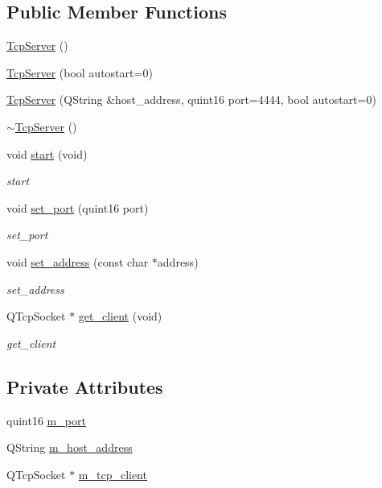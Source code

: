 \subsection*{Public Member Functions}
\begin{DoxyCompactItemize}
\item 
\mbox{\hyperlink{class_tcp_server_abc977059ef61f1c42f5fda1bc5945ab0}{Tcp\+Server}} ()
\item 
\mbox{\hyperlink{class_tcp_server_af43d51237b45ebb729911d829dfa7856}{Tcp\+Server}} (bool autostart=0)
\item 
\mbox{\hyperlink{class_tcp_server_a5242d1465353dd6e57bf556416021598}{Tcp\+Server}} (Q\+String \&host\+\_\+address, quint16 port=4444, bool autostart=0)
\item 
\mbox{\hyperlink{class_tcp_server_a728a9e31c53cf86887f1f6149b1c46dd}{$\sim$\+Tcp\+Server}} ()
\item 
void \mbox{\hyperlink{class_tcp_server_ab9a387d38fd311ae853b4b4006504096}{start}} (void)
\begin{DoxyCompactList}\small\item\em start \end{DoxyCompactList}\item 
void \mbox{\hyperlink{class_tcp_server_aaf6005b12641ab81bcf91099d9255437}{set\+\_\+port}} (quint16 port)
\begin{DoxyCompactList}\small\item\em set\+\_\+port \end{DoxyCompactList}\item 
void \mbox{\hyperlink{class_tcp_server_a3496c0dfa5e3c1cb5bf794739508eda4}{set\+\_\+address}} (const char $\ast$address)
\begin{DoxyCompactList}\small\item\em set\+\_\+address \end{DoxyCompactList}\item 
Q\+Tcp\+Socket $\ast$ \mbox{\hyperlink{class_tcp_server_a321f1064fd590efdeb1f9458b89afdca}{get\+\_\+client}} (void)
\begin{DoxyCompactList}\small\item\em get\+\_\+client \end{DoxyCompactList}\end{DoxyCompactItemize}
\subsection*{Private Attributes}
\begin{DoxyCompactItemize}
\item 
quint16 \mbox{\hyperlink{class_tcp_server_a01d5a7bfe29ae6632180be7899d3740f}{m\+\_\+port}}
\item 
Q\+String \mbox{\hyperlink{class_tcp_server_aa8fd2e3eebacb69a7f785ffcc2a69eee}{m\+\_\+host\+\_\+address}}
\item 
Q\+Tcp\+Socket $\ast$ \mbox{\hyperlink{class_tcp_server_a34a159e3301900eac7bf08346fc3615b}{m\+\_\+tcp\+\_\+client}}
\end{DoxyCompactItemize}


